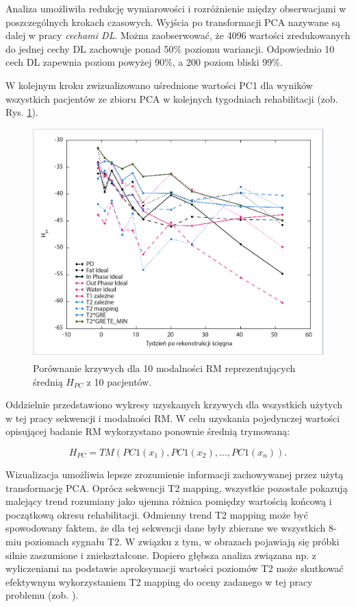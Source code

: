 Analiza umożliwiła redukcję wymiarowości i rozróżnienie między obserwacjami w poszczególnych krokach czasowych. Wyjścia po transformacji PCA nazywane \linebreak są dalej w pracy \textit{cechami DL}. Można zaobserwować, że 4096 wartości zredukowanych do jednej cechy DL zachowuje ponad 50\% poziomu wariancji. Odpowiednio 10 cech DL zapewnia poziom powyżej 90\%, a 200 poziom bliski 99\%. 

W kolejnym kroku zwizualizowano uśrednione wartości PC1 dla wyników wszystkich pacjentów ze zbioru PCA w kolejnych tygodniach rehabilitacji (zob. Rys. \ref{fig:H}).

\begin{figure}[h!]
	\centering
	\includegraphics[width=1\textwidth]{figures/H_PC1.jpg}
	\caption{Porównanie krzywych dla 10 modalności RM reprezentujących średnią $H_{PC}$ z 10 pacjentów.}\label{fig:H}
\end{figure}
Oddzielnie przedstawiono wykresy uzyskanych krzywych dla wszystkich użytych w tej pracy sekwencji i modalności RM. W celu uzyskania pojedynczej wartości opisującej badanie RM wykorzystano ponownie średnią trymowaną:

\begin{equation}
\label{ecq:HPC}
H_{PC} = TM(PC1(x_1), PC1(x_2),..., PC1(x_n)).
\end{equation}

Wizualizacja umożliwia lepsze zrozumienie informacji zachowywanej przez użytą transformację PCA. Oprócz sekwencji T2 mapping, wszystkie pozostałe pokazują malejący trend rozumiany jako ujemna różnica pomiędzy wartością końcową i początkową okresu rehabilitacji. Odmienny trend T2 mapping może być spowodowany faktem, że dla tej sekwencji dane były zbierane we wszystkich 8-miu poziomach sygnału T2. W związku z tym, w obrazach pojawiają się próbki silnie zaszumione \linebreak i zniekształcone. Dopiero głębsza analiza związana np. z wyliczeniami na podstawie aproksymacji wartości poziomów T2 może skutkować efektywnym wykorzystaniem T2 mapping do oceny zadanego w tej pracy problemu (zob. \cite{Regulski2017}). 

